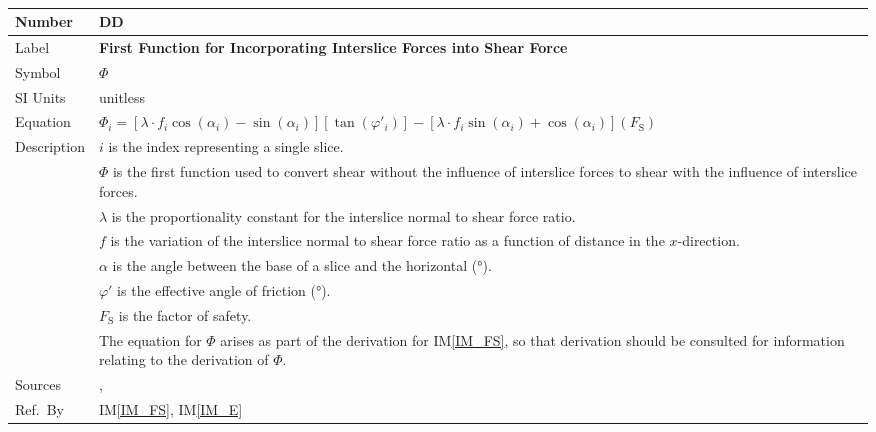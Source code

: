 \documentclass[12pt]{article}
\newcommand{\colAwidth}{0.13\textwidth}
\newcommand{\colBwidth}{0.82\textwidth}
\renewcommand{\arraystretch}{1}
\newcommand{\iref}[1]{IM\ref{#1}}
\newcounter{datadefnum} %
\newcounter{defnum} %
\begin{document}
~\newline


\noindent
\begin{minipage}{\textwidth}
	\renewcommand*{\arraystretch}{1.6}
	\begin{tabular}{| p{\colAwidth} | p{\colBwidth} |}
		
		\hline \rowcolor[gray]{0.9} Number&
		DD{datadefnum}\thedatadefnum \label{DD_Phi}\\
		
		\hline Label& \bf First Function for Incorporating Interslice Forces 
		into Shear Force\\
		\hline Symbol& $\Phi$\\
		\hline SI Units& unitless\\
		
		\hline
		Equation & 
		$\Phi_{i}= \left[ \lambda \cdot f_{i}
		\cos\left(\alpha_{i}\right) -
		\sin\left(\alpha_{i}\right) \right]\left[
		\tan\left({\varphi'_{i}}\right) \right] - \left[ \lambda
		\cdot f_{i} \sin\left(\alpha_{i}\right) +
		\cos\left(\alpha_{i}\right) \right]\left(F_\text{S}\right)$\\
		
		\hline Description &$i$ is the index representing a single slice.\\
		&$\Phi$ is the first function used to convert shear without the 
		influence of interslice forces to shear with the influence of 
		interslice forces.\\
		&$\lambda$ is the proportionality constant for the interslice normal to 
		shear force ratio.\\
		&$f$ is the variation of the interslice normal to shear force ratio as 
		a function of distance in the $x$-direction.\\
		&$\alpha$ is the angle between the base of a slice and the horizontal 
		(\si{\degree}).\\
		&$\varphi'$ is the effective angle of friction (\si{\degree}).\\
		&$F_\text{S}$ is the factor of safety.\\
		
		&The equation for $\Phi$ arises as part of the derivation for 
		\iref{IM_FS}, so that derivation should be consulted for information 
		relating to the derivation of $\Phi$.\\
		
		\hline Sources& \cite{ZhuEtAl2005}, \cite{Karchewski2012}\\
		
		\hline Ref.\ By & \iref{IM_FS}, \iref{IM_E}\\
		
		\hline
	\end{tabular}
\end{minipage}\\
\end{document}
